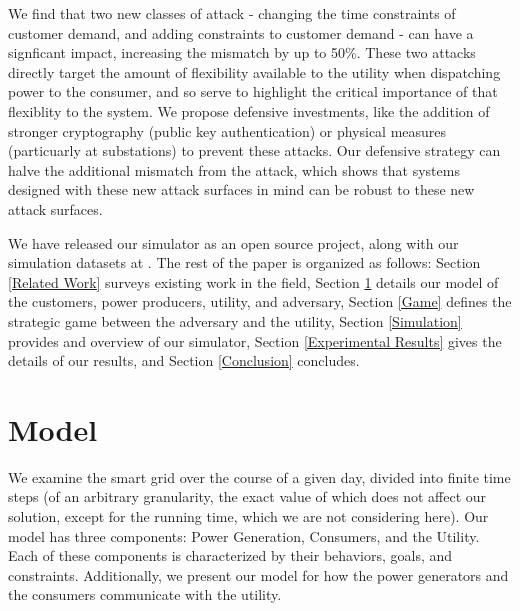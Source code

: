 \documentclass[conference]{IEEEtran}
\begin{document}
We find that two new classes of attack - changing the time constraints of customer demand, and adding constraints to customer demand - can have a signficant impact, increasing the mismatch by up to 50\%.  These two attacks directly target the amount of flexibility available to the utility when dispatching power to the consumer, and so serve to highlight the critical importance of that flexiblity to the system.  We propose defensive investments, like the addition of stronger cryptography (public key authentication) or physical measures (particuarly at substations) to prevent these attacks.  Our defensive strategy can halve the additional mismatch from the attack, which shows that systems designed with these new attack surfaces in mind can be robust to these new attack surfaces.  

We have released our simulator as an open source project, along with our simulation datasets at \cite{gridsec}.  The rest of the paper is organized as follows: Section \ref{Related Work} surveys existing work in the field, Section \ref{Model} details our model of the customers, power producers, utility, and adversary, Section \ref{Game} defines the strategic game between the adversary and the utility, Section \ref{Simulation} provides and overview of our simulator, Section \ref{Experimental Results} gives the details of our results, and Section \ref{Conclusion} concludes.


\section{Model}
\label{Model}

We examine the smart grid over the course of a given day, divided into finite time steps (of an arbitrary granularity, the exact value of which does not affect our solution, except for the running time, which we are not considering here). Our model has three components: Power Generation, Consumers, and the Utility. Each of these components is characterized by their behaviors, goals, and constraints. Additionally, we present our model for how the power generators and the consumers communicate with the utility. 
\end{document}
